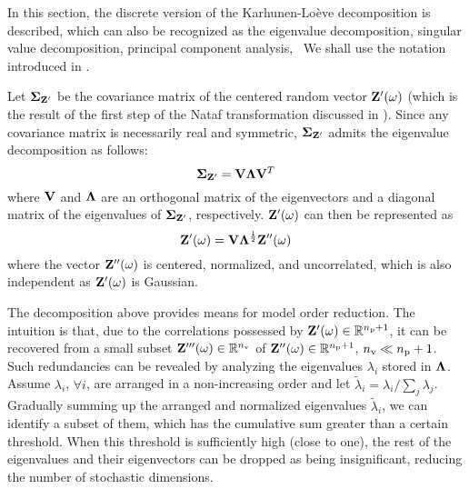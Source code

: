 In this section, the discrete version of the Karhunen-Lo\`{e}ve decomposition \cite{ghanem1991} is described, which can also be recognized as the eigenvalue decomposition, singular value decomposition, principal component analysis, \etc\ We shall use the notation introduced in .

Let $\mCov_{\vZ'}$ be the covariance matrix of the centered random vector $\mathbf{Z}'(\omega)$ (which is the result of the first step of the Nataf transformation discussed in ).
  Since any covariance matrix is necessarily real and symmetric, $\mCov_{\vZ'}$ admits the eigenvalue decomposition \cite{press2007} as follows:
\[
  \mCov_{\vZ'} = \m{V} \m{\Lambda} \m{V}^T
\]
where $\m{V}$ and $\m{\Lambda}$ are an orthogonal matrix of the eigenvectors and a diagonal matrix of the eigenvalues of $\mCov_{\vZ'}$, respectively.
$\mathbf{Z}'(\omega)$ can then be represented as
\[
  \vZ'(\o) = \m{V} \m{\Lambda}^\frac{1}{2} \vZ''(\o)
\]
where the vector $\mathbf{Z}''(\omega)$ is centered, normalized, and uncorrelated, which is also independent as $\mathbf{Z}'(\omega)$ is Gaussian.

The decomposition above provides means for model order reduction.
The intuition is that, due to the correlations possessed by $\mathbf{Z}'(\omega) \in \mathbb{R}^{{n_\text{p}} + 1}$, it can be recovered from a small subset $\mathbf{Z}'''(\omega) \in \mathbb{R}^{n_\text{v}}$ of $\mathbf{Z}''(\omega) \in \mathbb{R}^{{n_\text{p}} + 1}$, ${n_\text{v}} \ll {n_\text{p}} + 1$.
Such redundancies can be revealed by analyzing the eigenvalues $\lambda_i$ stored in $\m{\Lambda}$.
Assume $\lambda_i$, $\forall i$, are arranged in a non-increasing order and let $\tilde{\lambda}_i = \lambda_i / \sum_j \lambda_j$.
Gradually summing up the arranged and normalized eigenvalues $\tilde{\lambda}_i$, we can identify a subset of them, which has the cumulative sum greater than a certain threshold.
When this threshold is sufficiently high (close to one), the rest of the eigenvalues and their eigenvectors can be dropped as being insignificant, reducing the number of stochastic dimensions.
